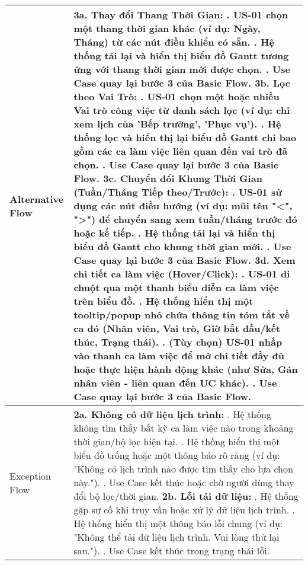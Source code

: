 \begin{longtable}{|m{4cm}|p{11cm}|}
\hline
Alternative Flow & \textbf{3a. Thay đổi Thang Thời Gian:} \newline    1. US-01 chọn một thang thời gian khác (ví dụ: Ngày, Tháng) từ các nút điều khiển có sẵn. \newline    2. Hệ thống tải lại và hiển thị biểu đồ Gantt tương ứng với thang thời gian mới được chọn. \newline    3. Use Case quay lại bước 3 của Basic Flow. \newline \textbf{3b. Lọc theo Vai Trò:} \newline    1. US-01 chọn một hoặc nhiều Vai trò công việc từ danh sách lọc (ví dụ: chỉ xem lịch của 'Bếp trưởng', 'Phục vụ'). \newline    2. Hệ thống lọc và hiển thị lại biểu đồ Gantt chỉ bao gồm các ca làm việc liên quan đến vai trò đã chọn. \newline    3. Use Case quay lại bước 3 của Basic Flow. \newline \textbf{3c. Chuyển đổi Khung Thời Gian (Tuần/Tháng Tiếp theo/Trước):} \newline    1. US-01 sử dụng các nút điều hướng (ví dụ: mũi tên "<", ">") để chuyển sang xem tuần/tháng trước đó hoặc kế tiếp. \newline    2. Hệ thống tải lại và hiển thị biểu đồ Gantt cho khung thời gian mới. \newline    3. Use Case quay lại bước 3 của Basic Flow. \newline \textbf{3d. Xem chi tiết ca làm việc (Hover/Click):} \newline    1. US-01 di chuột qua một thanh biểu diễn ca làm việc trên biểu đồ. \newline    2. Hệ thống hiển thị một tooltip/popup nhỏ chứa thông tin tóm tắt về ca đó (Nhân viên, Vai trò, Giờ bắt đầu/kết thúc, Trạng thái). \newline    3. (Tùy chọn) US-01 nhấp vào thanh ca làm việc để mở chi tiết đầy đủ hoặc thực hiện hành động khác (như Sửa, Gán nhân viên - liên quan đến UC khác). \newline    4. Use Case quay lại bước 3 của Basic Flow. \\
\hline
Exception Flow & \textbf{2a. Không có dữ liệu lịch trình:} \newline    1. Hệ thống không tìm thấy bất kỳ ca làm việc nào trong khoảng thời gian/bộ lọc hiện tại. \newline    2. Hệ thống hiển thị một biểu đồ trống hoặc một thông báo rõ ràng (ví dụ: "Không có lịch trình nào được tìm thấy cho lựa chọn này."). \newline    3. Use Case kết thúc hoặc chờ người dùng thay đổi bộ lọc/thời gian. \newline \textbf{2b. Lỗi tải dữ liệu:} \newline    1. Hệ thống gặp sự cố khi truy vấn hoặc xử lý dữ liệu lịch trình. \newline    2. Hệ thống hiển thị một thông báo lỗi chung (ví dụ: "Không thể tải dữ liệu lịch trình. Vui lòng thử lại sau."). \newline    3. Use Case kết thúc trong trạng thái lỗi. \\

\end{longtable}
